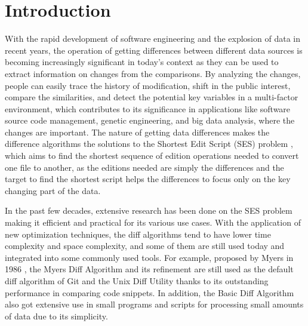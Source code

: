 \documentclass[sigplan,screen]{acmart}
\begin{document}
\section{Introduction}
\label{section:intro}
With the rapid development of software engineering and the explosion of data in recent years, the operation of getting differences between different data sources is becoming increasingly significant in today's context as they can be used to extract information on changes from the comparisons. By analyzing the changes, people can easily trace the history of modification, shift in the public interest, compare the similarities, and detect the potential key variables in a multi-factor environment, which contributes to its significance in applications like software source code management, genetic engineering, and big data analysis, where the changes are important. \cite{lijuAlgorithmDeriveShortest2022, myersAnONDDifference1986, goslingRedisplayAlgorithm1981, harelFastAlgorithmsFinding1984, rochkindSourceCodeControl1975a} The nature of getting data differences makes the difference algorithms the solutions to the Shortest Edit Script (SES) problem \cite{lijuAlgorithmDeriveShortest2022, myersAnONDDifference1986, masekFasterAlgorithmComputing1980}, which aims to find the shortest sequence of edition operations needed to convert one file to another, as the editions needed are simply the differences and the target to find the shortest script helps the differences to focus only on the key changing part of the data.

In the past few decades, extensive research has been done on the SES problem making it efficient and practical for its various use cases. \cite{myersAnONDDifference1986, lijuAlgorithmDeriveShortest2022, harelFastAlgorithmsFinding1984, goslingRedisplayAlgorithm1981} With the application of new optimization techniques, the diff algorithms tend to have lower time complexity and space complexity, and some of them are still used today and integrated into some commonly used tools. For example, proposed by Myers in 1986 \cite{myersAnONDDifference1986}, the Myers Diff Algorithm and its refinement are still used as the default diff algorithm of Git and the Unix Diff Utility thanks to its outstanding performance in comparing code snippets. In addition, the Basic Diff Algorithm \cite{wagnerStringtoStringCorrectionProblem1974} also got extensive use in small programs and scripts for processing small amounts of data due to its simplicity.
\end{document}
